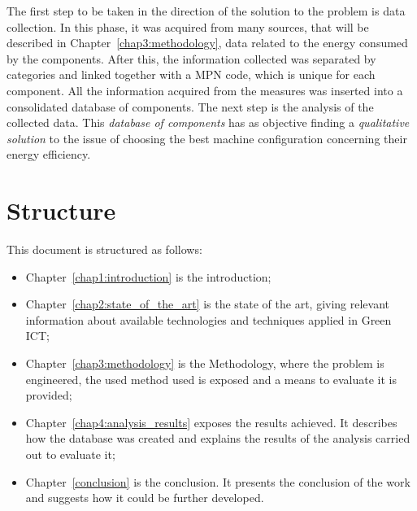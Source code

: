     The first step to be taken in the direction of the solution to the problem is data collection. In this phase, it was acquired from many sources, that will be described in Chapter~\ref{chap3:methodology}, data related to the energy consumed by the components. After this, the information collected was separated by categories and linked together with a MPN code, which is unique for each component. All the information acquired from the measures was inserted into a consolidated database of components. The next step is the analysis of the collected data. This \emph{database of components} has as objective finding a \emph{qualitative solution} to the issue of choosing the best machine configuration concerning their energy efficiency.

\section{Structure} \label{sec1:structure}

    This document is structured as follows:
    \begin{itemize}
        \item Chapter~\ref{chap1:introduction} is the introduction;
        \item Chapter~\ref{chap2:state_of_the_art} is the state of the art, giving relevant information about available technologies and techniques applied in Green ICT;
        \item Chapter~\ref{chap3:methodology} is the Methodology, where the problem is engineered, the used method used is exposed and a means to evaluate it is provided;
        \item Chapter~\ref{chap4:analysis_results} exposes the results achieved. It describes how the database was created and explains the results of the analysis carried out to evaluate it;
        \item Chapter~\ref{conclusion} is the conclusion. It presents the conclusion of the work and suggests how it could be further developed.
    \end{itemize}
    
    
